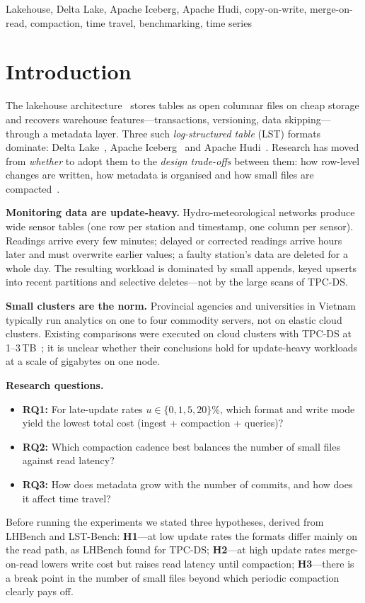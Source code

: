 \documentclass[conference]{IEEEtran}
\begin{document}
\begin{IEEEkeywords}
Lakehouse, Delta Lake, Apache Iceberg, Apache Hudi, copy-on-write, merge-on-read, compaction, time travel,
benchmarking, time series
\end{IEEEkeywords}

\section{Introduction}
The lakehouse architecture~\cite{armbrust2021lakehouse} stores tables as open columnar files on cheap storage
and recovers warehouse features---transactions, versioning, data skipping---through a metadata layer. Three such
\emph{log-structured table} (LST) formats dominate: Delta Lake~\cite{armbrust2020delta}, Apache
Iceberg~\cite{iceberg-spec} and Apache Hudi~\cite{hudi-docs}. Research has moved from \emph{whether} to adopt them
to the \emph{design trade-offs} between them: how row-level changes are written, how metadata is organised and how
small files are compacted~\cite{jain2023lhbench,camacho2024lstbench,gruenheid2025autocomp}.

\textbf{Monitoring data are update-heavy.} Hydro-meteorological networks produce wide sensor tables
(one row per station and timestamp, one column per sensor). Readings arrive every few minutes; delayed or
corrected readings arrive hours later and must overwrite earlier values; a faulty station's data are deleted for a
whole day. The resulting workload is dominated by small appends, keyed upserts into recent partitions and
selective deletes---not by the large scans of TPC-DS.

\textbf{Small clusters are the norm.} Provincial agencies and universities in Vietnam typically run analytics on one
to four commodity servers, not on elastic cloud clusters. Existing comparisons were executed on cloud clusters with
TPC-DS at 1--3\,TB~\cite{jain2023lhbench,camacho2024lstbench}; it is unclear whether their conclusions hold for
update-heavy workloads at a scale of gigabytes on one node.

\textbf{Research questions.}
\begin{itemize}
\item \textbf{RQ1:} For late-update rates $u\in\{0,1,5,20\}\%$, which format and write mode yield the lowest total
cost (ingest + compaction + queries)?
\item \textbf{RQ2:} Which compaction cadence best balances the number of small files against read latency?
\item \textbf{RQ3:} How does metadata grow with the number of commits, and how does it affect time travel?
\end{itemize}
Before running the experiments we stated three hypotheses, derived from LHBench and LST-Bench:
\textbf{H1}---at low update rates the formats differ mainly on the read path, as LHBench found for TPC-DS;
\textbf{H2}---at high update rates merge-on-read lowers write cost but raises read latency until compaction;
\textbf{H3}---there is a break point in the number of small files beyond which periodic compaction clearly pays off.
\end{document}
